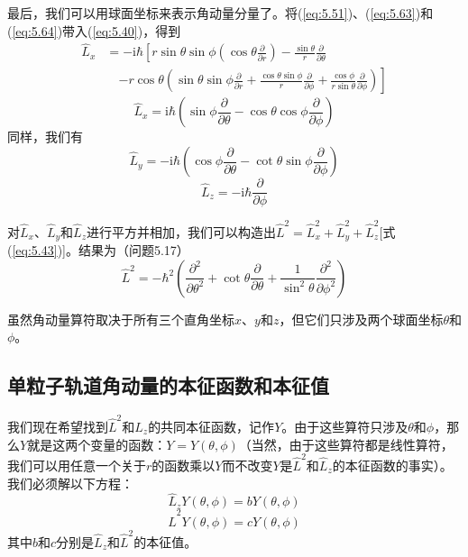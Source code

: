     最后，我们可以用球面坐标来表示角动量分量了。将(\ref{eq:5.51})、(\ref{eq:5.63})和(\ref{eq:5.64})带入(\ref{eq:5.40})，得到
    \begin{equation*}
        \begin{aligned}
            \hat{L}_x & = -\mathrm{i}\hbar\left[r\sin\theta\sin\phi\left(\cos\theta\frac{\partial}{\partial r}\right) - \frac{\sin\theta}{r}\frac{\partial }{\partial\theta}\right.\\
            &  \quad \left.-r\cos\theta\left(\sin\theta\sin\phi\frac{\partial}{\partial r} +\frac{\cos\theta\sin\phi}{r}\frac{\partial}{\partial \phi}+\frac{\cos\phi}{r\sin\theta}\frac{\partial}{\partial \phi}\right)\right]
        \end{aligned}
    \end{equation*}
    \begin{equation}
        \hat{L}_x = \mathrm{i}\hbar\left(\sin\phi\frac{\partial}{\partial \theta} - \cos\theta\cos\phi\frac{\partial}{\partial \phi}\right)
        \label{eq:5.65}
    \end{equation}
    同样，我们有
    \begin{equation}
        \hat{L}_y = -\mathrm{i}\hbar\left(\cos\phi\frac{\partial}{\partial \theta} - \cot\theta\sin\phi\frac{\partial}{\partial \phi}\right)
        \label{eq:5.66}
    \end{equation}
    \begin{equation}
        \hat{L}_z = -\mathrm{i}\hbar\frac{\partial}{\partial \phi}
        \label{eq:5.67}
    \end{equation}

    对$\hat{L}_x$、$\hat{L}_y$和$\hat{L}_z$进行平方并相加，我们可以构造出$\hat{L}^2 = \hat{L}_x^2 + \hat{L}_y^2 + \hat{L}_z^2$[式(\ref{eq:5.43})]。结果为（问题5.17）
    \begin{equation}
        \hat{L}^2 = -\hbar^2\left(\frac{\partial^2}{\partial\theta^2} + \cot\theta\frac{\partial}{\partial\theta} + \frac{1}{\sin^2\theta}\frac{\partial^2}{\partial \phi^2}\right)
        \label{eq:5.68}
    \end{equation}

    虽然角动量算符取决于所有三个直角坐标$x$、$y$和$z$，但它们只涉及两个球面坐标$\theta$和$\phi$。

    \subsection*{单粒子轨道角动量的本征函数和本征值}
    我们现在希望找到$\hat{L}^2$和$\hat{L}_z$的共同本征函数，记作$Y$。由于这些算符只涉及$\theta$和$\phi$，那么$Y$就是这两个变量的函数：$Y = Y\left(\theta,\phi\right)$（当然，由于这些算符都是线性算符，我们可以用任意一个关于$r$的函数乘以$Y$而不改变$Y$是$\hat{L}^2$和$\hat{L}_z$的本征函数的事实）。我们必须解以下方程：
    \begin{equation}
        \hat{L}_zY\left(\theta,\phi\right) = bY\left(\theta,\phi\right)
        \label{eq:5.69}
    \end{equation}
    \begin{equation}
        \hat{L}^2Y\left(\theta,\phi\right) = cY\left(\theta,\phi\right)
        \label{eq:5.70}
    \end{equation}
    其中$b$和$c$分别是$\hat{L}_z$和$\hat{L}^2$的本征值。


